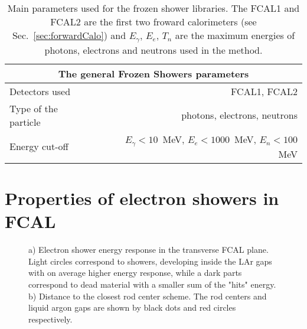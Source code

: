 \begin{table}[!tbp]
\caption{Main parameters used for the frozen shower libraries. The FCAL1 and FCAL2 are the first two froward calorimeters (see Sec.~\ref{sec:forwardCalo}) and $E_{\gamma}$, $E_{e}$, $T_n$ are the maximum energies of photons, electrons and neutrons used in the method. 
}
\label{tab:MC_FS_params}
\centering
\begin{tabular}{l|r}
\hline
\hline
\multicolumn{2}{c}{The general Frozen Showers parameters} \\
\hline
Detectors used            & FCAL1, FCAL2\\
Type of the particle      & photons, electrons, neutrons \\
Energy cut-off            &  $E_{\gamma}<10$~MeV,  $E_{e}<1000$~MeV,  $E_n<100$~MeV \\
\hline
\end{tabular}
\end{table}

\section{Properties of electron showers in FCAL}\label{sec:FSproblem}





\begin{figure}[!tbp]
\begin{minipage}[h]{0.49\linewidth}
\end{minipage}
\hfill
\begin{minipage}[h]{0.49\linewidth}
\end{minipage}
\caption{ a) Electron shower energy response  in the transverse FCAL plane. Light circles correspond to showers, developing inside the LAr gaps with on average higher energy response, while a dark parts correspond to dead material with a smaller sum of the "hits" energy.
b) Distance to the closest rod center scheme. The rod centers and liquid argon gaps are shown by black dots and red circles respectively.}
\label{fig:FSFluctuations}
\end{figure}


